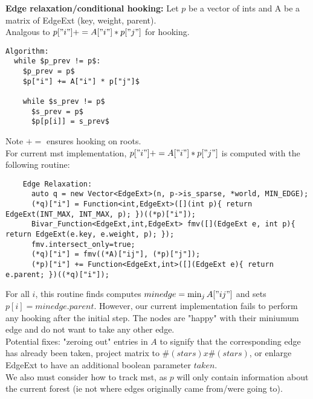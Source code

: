 \documentclass[11pt]{article}
\title{}
\author{}
\begin{document}
\maketitle

\textbf{Edge relaxation/conditional hooking:} Let $p$ be a vector of ints and A be a matrix of EdgeExt (key, weight, parent).\\
Analgous to $p["i"] += A["i"] * p["j"]$ for hooking.

\begin{lstlisting}
Algorithm:
  while $p_prev != p$:
    $p_prev = p$
    $p["i"] += A["i"] * p["j"]$
    
    while $s_prev != p$
      $s_prev = p$
      $p[p[i]] = s_prev$
\end{lstlisting}

Note $+=$ ensures hooking on roots.\\

For current mst implementation, $p["i"] += A["i"] * p["j"]$ is computed with the following routine:
\begin{lstlisting}
    Edge Relaxation:
      auto q = new Vector<EdgeExt>(n, p->is_sparse, *world, MIN_EDGE);
      (*q)["i"] = Function<int,EdgeExt>([](int p){ return EdgeExt(INT_MAX, INT_MAX, p); })((*p)["i"]);
      Bivar_Function<EdgeExt,int,EdgeExt> fmv([](EdgeExt e, int p){ return EdgeExt(e.key, e.weight, p); });
      fmv.intersect_only=true;
      (*q)["i"] = fmv((*A)["ij"], (*p)["j"]);
      (*p)["i"] += Function<EdgeExt,int>([](EdgeExt e){ return e.parent; })((*q)["i"]);
\end{lstlisting}

For all $i$, this routine finds computes $minedge = \min_{j} A["ij"]$ and sets $p[i] = minedge.parent$. However, our current implementation fails to perform any hooking after the initial step. The nodes are "happy" with their miniumum edge and do not want to take any other edge.\\

Potential fixes: "zeroing out" entries in $A$ to signify that the corresponding edge has already been taken, project matrix to $\#(stars) x \#(stars)$, or enlarge EdgeExt to have an additional boolean parameter $taken$.\\

We also must consider how to track mst, as $p$ will only contain information about the current forest (ie not where edges originally came from/were going to).
\end{document}

